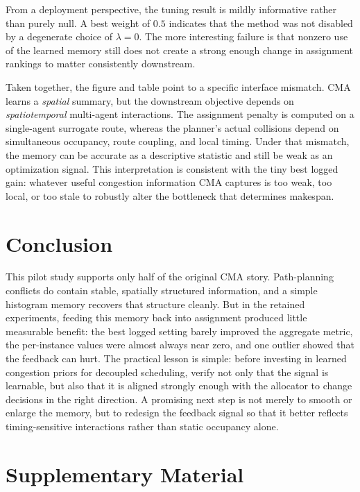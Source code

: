 \documentclass{article} %
\begin{document}
From a deployment perspective, the tuning result is mildly informative rather than purely null. A best weight of $0.5$ indicates that the method was not disabled by a degenerate choice of $\lambda=0$. The more interesting failure is that nonzero use of the learned memory still does not create a strong enough change in assignment rankings to matter consistently downstream.

Taken together, the figure and table point to a specific interface mismatch. CMA learns a \emph{spatial} summary, but the downstream objective depends on \emph{spatiotemporal} multi-agent interactions. The assignment penalty is computed on a single-agent surrogate route, whereas the planner's actual collisions depend on simultaneous occupancy, route coupling, and local timing. Under that mismatch, the memory can be accurate as a descriptive statistic and still be weak as an optimization signal. This interpretation is consistent with the tiny best logged gain: whatever useful congestion information CMA captures is too weak, too local, or too stale to robustly alter the bottleneck that determines makespan.

\section{Conclusion}
\label{sec:conclusion}

This pilot study supports only half of the original CMA story. Path-planning conflicts do contain stable, spatially structured information, and a simple histogram memory recovers that structure cleanly. But in the retained experiments, feeding this memory back into assignment produced little measurable benefit: the best logged setting barely improved the aggregate metric, the per-instance values were almost always near zero, and one outlier showed that the feedback can hurt. The practical lesson is simple: before investing in learned congestion priors for decoupled scheduling, verify not only that the signal is learnable, but also that it is aligned strongly enough with the allocator to change decisions in the right direction. A promising next step is not merely to smooth or enlarge the memory, but to redesign the feedback signal so that it better reflects timing-sensitive interactions rather than static occupancy alone.




\appendix
\section{Supplementary Material}
\label{sec:appendix}
\end{document}
